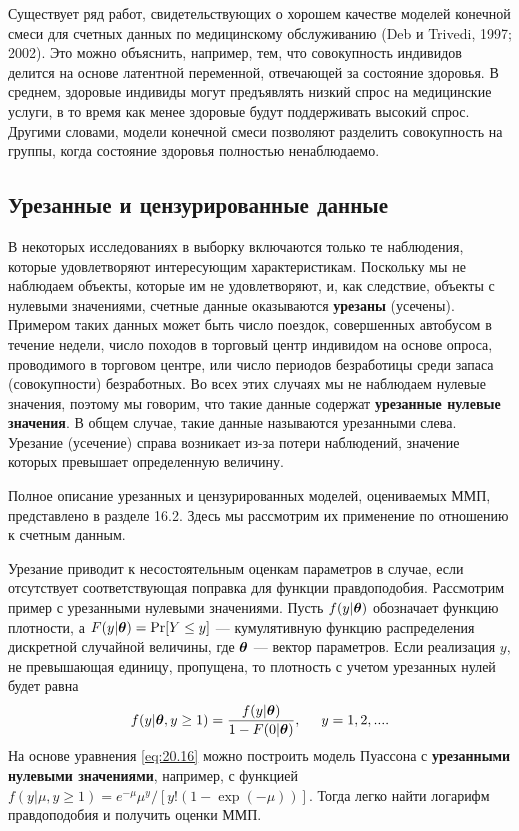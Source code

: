 Существует ряд работ, свидетельствующих о хорошем качестве моделей конечной смеси для счетных данных по медицинскому обслуживанию (Deb и Trivedi, 1997; 2002). Это можно объяснить, например, тем, что совокупность индивидов делится на основе латентной переменной, отвечающей за состояние здоровья. В среднем, здоровые индивиды могут предъявлять низкий спрос на медицинские услуги, в то время как менее здоровые будут поддерживать высокий спрос. Другими словами, модели конечной смеси позволяют разделить совокупность на группы, когда состояние здоровья полностью ненаблюдаемо.


\subsection{Урезанные и цензурированные данные}\label{sec:20.4.4}

\noindent
В некоторых исследованиях в выборку включаются только те наблюдения, которые удовлетворяют интересующим характеристикам. Поскольку мы не наблюдаем объекты, которые им не удовлетворяют, и, как следствие, объекты с нулевыми значениями, счетные данные оказываются \textbf{урезаны} (усечены). Примером таких данных может быть число поездок, совершенных автобусом в течение недели, число походов в торговый центр индивидом на основе опроса, проводимого в торговом центре, или число периодов безработицы среди запаса (совокупности) безработных. Во всех этих случаях мы не наблюдаем нулевые значения, поэтому мы говорим, что такие данные содержат \textbf{урезанные нулевые значения}. В общем случае, такие данные называются урезанными слева. Урезание (усечение) справа возникает из-за потери наблюдений, значение которых превышает определенную величину.

Полное описание урезанных и цензурированных моделей, оцениваемых ММП, представлено в разделе 16.2. Здесь мы рассмотрим их применение по отношению к счетным данным.

Урезание приводит к несостоятельным оценкам параметров в случае, если отсутствует соответствующая поправка для функции правдоподобия. Рассмотрим пример с урезанными нулевыми значениями. Пусть $f(y|\bm{\theta})$ обозначает функцию плотности, а $F(y|\bm{\theta}) = \mathrm{Pr}[Y \le y]$ --- кумулятивную функцию распределения дискретной случайной величины, где $\bm{\theta}$ --- вектор параметров. Если реализация $y$, не превышающая единицу, пропущена, то плотность с учетом урезанных нулей будет равна
    \begin{align}\label{eq:20.16}
    f(y|\bm{\theta}, y \ge 1) = \frac{f(y|\bm{\theta})}{1 - F(0|\bm{\theta})}, \hspace{0.5cm} y = 1, 2, ... .
    \end{align}
На основе уравнения \ref{eq:20.16} можно построить модель Пуассона с \textbf{урезанными нулевыми значениями}, например, с функцией $f(y|\mu, y \ge 1) = e^{-\mu}\mu^y / [y!(1 - \exp(-\mu))]$. Тогда легко найти логарифм правдоподобия и получить оценки ММП.

